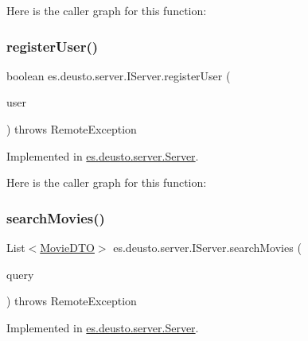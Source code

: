 Here is the caller graph for this function\+:
\mbox{\label{interfacees_1_1deusto_1_1server_1_1_i_server_a998e20655e760b135fab601a417aa5ae}} 
\subsubsection{\texorpdfstring{registerUser()}{registerUser()}}
{\footnotesize\ttfamily boolean es.\+deusto.\+server.\+I\+Server.\+register\+User (\begin{DoxyParamCaption}\item[{\mbox{\hyperlink{classes_1_1deusto_1_1server_1_1data_1_1_user_details_d_t_o}{User\+Details\+D\+TO}}}]{user }\end{DoxyParamCaption}) throws Remote\+Exception}



Implemented in \mbox{\hyperlink{classes_1_1deusto_1_1server_1_1_server_a6a419bd82bce60f072b4c7f5a527abdc}{es.\+deusto.\+server.\+Server}}.

Here is the caller graph for this function\+:
\mbox{\label{interfacees_1_1deusto_1_1server_1_1_i_server_a50b7dacdeb04d5f1ee3f3b59989ed117}} 
\subsubsection{\texorpdfstring{searchMovies()}{searchMovies()}}
{\footnotesize\ttfamily List$<$\mbox{\hyperlink{classes_1_1deusto_1_1server_1_1data_1_1_movie_d_t_o}{Movie\+D\+TO}}$>$ es.\+deusto.\+server.\+I\+Server.\+search\+Movies (\begin{DoxyParamCaption}\item[{String}]{query }\end{DoxyParamCaption}) throws Remote\+Exception}



Implemented in \mbox{\hyperlink{classes_1_1deusto_1_1server_1_1_server_a16789cc76edd46978ffbb58581caf5db}{es.\+deusto.\+server.\+Server}}.

\mbox{\label{interfacees_1_1deusto_1_1server_1_1_i_server_aff376200af975b145ac85ccfdf48a229}} 
